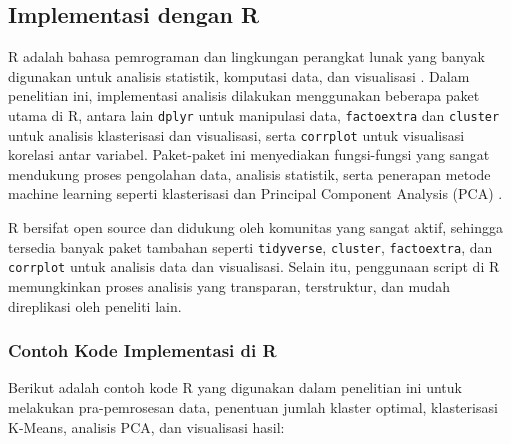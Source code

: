 \subsection{Implementasi dengan R}
R adalah bahasa pemrograman dan lingkungan perangkat lunak yang banyak digunakan untuk analisis statistik, komputasi data, dan visualisasi \parencite{RCoreTeam2024}. Dalam penelitian ini, implementasi analisis dilakukan menggunakan beberapa paket utama di R, antara lain \texttt{dplyr} untuk manipulasi data, \texttt{factoextra} dan \texttt{cluster} untuk analisis klasterisasi dan visualisasi, serta \texttt{corrplot} untuk visualisasi korelasi antar variabel. Paket-paket ini menyediakan fungsi-fungsi yang sangat mendukung proses pengolahan data, analisis statistik, serta penerapan metode machine learning seperti klasterisasi dan Principal Component Analysis (PCA) \parencite{Wickham2023, Szczesna2022}.

R bersifat open source dan didukung oleh komunitas yang sangat aktif, sehingga tersedia banyak paket tambahan seperti \texttt{tidyverse}, \texttt{cluster}, \texttt{factoextra}, dan \texttt{corrplot} untuk analisis data dan visualisasi. Selain itu, penggunaan script di R memungkinkan proses analisis yang transparan, terstruktur, dan mudah direplikasi oleh peneliti lain.
\subsubsection{Contoh Kode Implementasi di R}

Berikut adalah contoh kode R yang digunakan dalam penelitian ini untuk melakukan pra-pemrosesan data, penentuan jumlah klaster optimal, klasterisasi K-Means, analisis PCA, dan visualisasi hasil:

